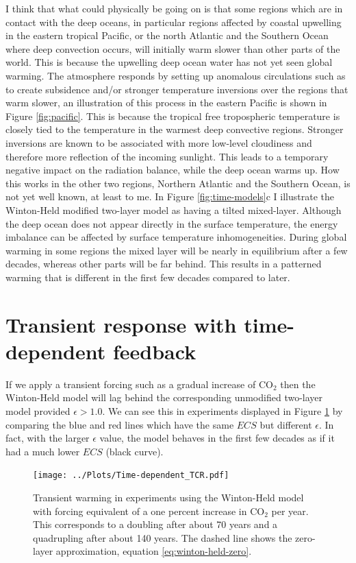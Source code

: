 \documentclass[12pt]{book}
\begin{document}
I think that what could physically be going on is that some regions which are in contact with the deep oceans, in particular regions affected by coastal upwelling in the eastern tropical Pacific, or the north Atlantic and the Southern Ocean where deep convection occurs, will initially warm slower than other parts of the world. This is because the upwelling deep ocean water has not yet seen global warming. The atmosphere responds by setting up anomalous circulations such as to create subsidence and/or stronger temperature inversions over the regions that warm slower, an illustration of this process in the eastern Pacific is shown in Figure \ref{fig:pacific}. This is because the tropical free tropospheric temperature is closely tied to the temperature in the warmest deep convective regions. Stronger inversions are known to be associated with more low-level cloudiness and therefore more reflection of the incoming sunlight. This leads to a temporary negative impact on the radiation balance, while the deep ocean warms up. How this works in the other two regions, Northern Atlantic and the Southern Ocean, is not yet well known, at least to me.
In Figure \ref{fig:time-models}c I illustrate the Winton-Held modified two-layer model as having a tilted mixed-layer. Although the deep ocean does not appear directly in the surface temperature, the energy imbalance can be affected by surface temperature inhomogeneities. During global warming in some regions the mixed layer will be nearly in equilibrium after a few decades, whereas other parts will be far behind. This results in a patterned warming that is different in the first few decades compared to later. 

\section{Transient response with time-dependent feedback}
If we apply a transient forcing such as a gradual increase of CO$_2$ then the Winton-Held model will lag behind the corresponding unmodified two-layer model provided $\epsilon > 1.0$. We can see this in experiments displayed in Figure \ref{fig:transient_warming_time-dependent} by comparing the blue and red lines which have the same $ECS$ but different $\epsilon$. In fact, with the larger $\epsilon$ value, the model behaves in the first few decades as if it had a much lower $ECS$ (black curve). 

\begin{figure}
\begin{center}
\texttt{[image: ../Plots/Time-dependent\_TCR.pdf]}
\end{center}
\caption{ Transient warming in experiments using the Winton-Held model with forcing equivalent of a one percent increase in CO$_2$ per year. This corresponds to a doubling after about 70 years and a quadrupling after about 140 years. The dashed line shows the zero-layer approximation, equation \ref{eq:winton-held-zero}. } 
\label{fig:transient_warming_time-dependent}
\end{figure}
\end{document}
